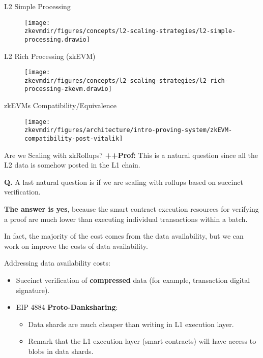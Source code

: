 \begin{frame}{L2 Simple Processing}
\begin{figure}
\texttt{[image: \\zkevmdir/figures/concepts/l2-scaling-strategies/l2-simple-processing.drawio]}
\end{figure}
\end{frame}






\begin{frame}{L2 Rich Processing (zkEVM)}
\begin{figure}
\texttt{[image: \\zkevmdir/figures/concepts/l2-scaling-strategies/l2-rich-processing-zkevm.drawio]}
\end{figure}
\end{frame}



\begin{frame}{zkEVMs Compatibility/Equivalence}
\begin{figure}
\texttt{[image: \\zkevmdir/figures/architecture/intro-proving-system/zkEVM-compatibility-post-vitalik]}
\end{figure}
\end{frame}




\begin{frame}{Are we Scaling with zkRollups?}
\ifPROF
\footnotesize
\textbf{++Prof:} This is a natural question since all the L2 data is somehow posted in the L1 chain.
\normalsize
\fi

\textbf{Q.} A last natural question is if we are scaling with rollups based on succinct verification.

\textbf{The answer is yes}, because the smart contract execution resources for verifying a proof are much lower
than executing individual transactions within a batch.


In fact, the majority of the cost comes from the data availability, but we can work on improve the costs of data availability.

\vspace{0.2cm}
Addressing data availability costs:
  \begin{itemize}
  \item Succinct verification of \textbf{compressed} data (for example, transaction digital signature).
  \item EIP 4884 \textbf{Proto-Danksharing}:
    \begin{itemize}
    \item Data shards are much cheaper than writing in L1 execution layer.
    \item Remark that the L1 execution layer (smart contracts) will have access to blobs in data shards.
    \end{itemize}
  \end{itemize}
\end{frame}
